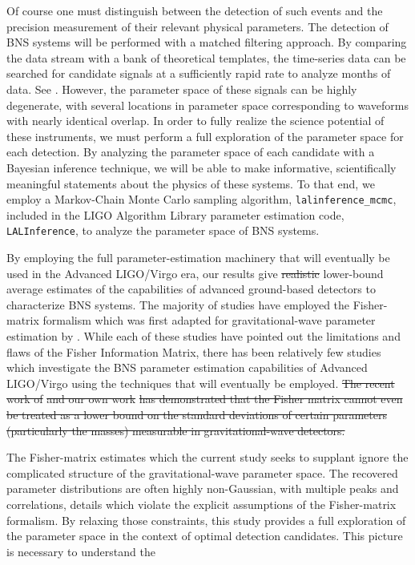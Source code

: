 \documentclass[11pt,a4paper]{emulateapj} 
\newcommand{\carl}[1]{{\color{red} #1}}
\begin{document}
Of course one must distinguish between the detection of such events
and the precision measurement of their relevant physical parameters.
The detection of BNS systems will be performed with a matched
filtering approach.  By comparing the data stream with a bank of
theoretical templates, the time-series data can be searched for
candidate signals at a sufficiently rapid rate to analyze months of
data.  See \cite{S6search}.  However, the parameter space
of these signals can be highly degenerate, with several locations in
parameter space corresponding to waveforms with nearly identical overlap.  In order
to fully realize the science potential of these instruments, we must
perform a full exploration of the parameter space for each detection.
By analyzing the parameter space of each candidate with a Bayesian
inference technique, we will be able to make informative, scientifically
meaningful statements about the physics of these systems.  To that
end, we employ a Markov-Chain Monte Carlo sampling algorithm,
\texttt{lalinference\_mcmc}, included in the LIGO Algorithm Library
parameter estimation code, \texttt{LALInference}, to analyze the
parameter space of BNS systems.

By employing the full parameter-estimation machinery that will
eventually be used in the Advanced LIGO/Virgo era, our results
 give \sout{realistic} \carl{lower-bound average} estimates of the capabilities of
advanced ground-based detectors to characterize BNS systems.  
The majority of studies have employed the Fisher-matrix
formalism which was first adapted for gravitational-wave parameter
estimation by \citet{FinnDetection}.  While each of these studies
\citep{PoissonWill,CutlerFlanagan,ArunPE} have pointed out the
limitations and flaws of the Fisher Information Matrix, there has been
relatively few studies which investigate the BNS parameter estimation capabilities
of Advanced LIGO/Virgo using the techniques that will eventually be
employed.  \sout{The recent work of} \cite{Vallisneri} \sout{and our own work}
\citep{Inadequacies} \sout{ has demonstrated that the Fisher matrix cannot
even be treated as a lower bound on the standard deviations of certain
parameters (particularly the masses) measurable in gravitational-wave
detectors.}

\carl{The Fisher-matrix estimates which the current study seeks to supplant ignore 
the complicated structure of the gravitational-wave parameter space.  The recovered
parameter distributions are often highly non-Gaussian, with multiple peaks and correlations, details
which violate the explicit assumptions of the Fisher-matrix formalism.   By relaxing those constraints, this study
provides a full exploration of the parameter space in the context of optimal detection candidates.  This picture is
necessary to understand the } 
\end{document}
